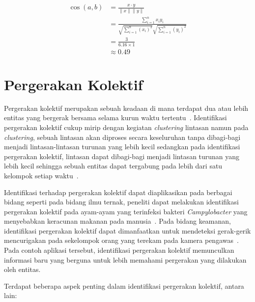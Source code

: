 \begin{equation}
    \begin{aligned}
        \cos (a, b) & = \frac{x \cdot y}{\|x\| \|y\|} \\
        & = \frac{ \sum_{i=1}^{n}{x_i y_i}}{ \sqrt{\sum_{i=1}^{n}{(x_i)^2}} \sqrt{\sum_{i=1}^{n}{(y_i)^2}}} \\
        & = \frac{3}{6.16 \times 1} \\
        & \approx 0.49
    \end{aligned}
    \label{bab2:perhitungan-cosine-similarity}
\end{equation}


\section{Pergerakan Kolektif}
\label{sec:collective-movement}

Pergerakan kolektif merupakan sebuah keadaan di mana terdapat dua atau lebih entitas yang bergerak bersama selama kurun waktu tertentu~\cite{wiratma:trajectory}. Identifikasi pergerakan kolektif cukup mirip dengan kegiatan \textit{clustering} lintasan namun pada \textit{clustering}, sebuah lintasan akan diproses secara keseluruhan tanpa dibagi-bagi menjadi lintasan-lintasan turunan yang lebih kecil sedangkan pada identifikasi pergerakan kolektif, lintasan dapat dibagi-bagi menjadi lintasan turunan yang lebih kecil sehingga sebuah entitas dapat tergabung pada lebih dari satu kelompok setiap waktu~\cite{wiratma:trajectory}.

Identifikasi terhadap pergerakan kolektif dapat diaplikasikan pada berbagai bidang seperti pada bidang ilmu ternak, peneliti dapat melakukan identifikasi pergerakan kolektif pada ayam-ayam yang terinfeksi bakteri \textit{Campylobacter} yang menyebabkan keracunan makanan pada manusia~\cite{colles:02:chicken}. Pada bidang keamanan, identifikasi pergerakan kolektif dapat dimanfaatkan untuk mendeteksi gerak-gerik mencurigakan pada sekelompok orang yang terekam pada kamera pengawas~\cite{makris:01:security}. Pada contoh aplikasi tersebut, identifikasi pergerakan kolektif memunculkan informasi baru yang berguna untuk lebih memahami pergerakan yang dilakukan oleh entitas.

\noindent Terdapat beberapa aspek penting dalam identifikasi pergerakan kolektif, antara lain:

